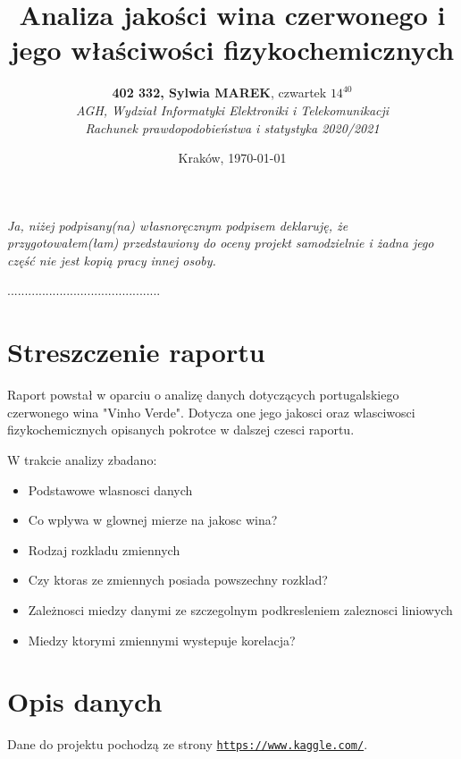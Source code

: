 \documentclass{article}
\title{Analiza jakości wina czerwonego i jego właściwości fizykochemicznych}
\author{\textbf{402 332, Sylwia MAREK}, czwartek $14^{40}$\\ 
\textit{AGH, Wydział Informatyki Elektroniki i Telekomunikacji}\\
\textit{Rachunek prawdopodobieństwa i statystyka 2020/2021}}
\date{Kraków, \today}
\begin{document}






\maketitle

\textit{Ja, niżej podpisany(na) własnoręcznym podpisem deklaruję, że przygotowałem(łam) przedstawiony do oceny projekt samodzielnie i żadna jego część nie jest kopią pracy innej osoby.}
\begin{flushright}
{............................................}
\end{flushright}

\section{Streszczenie raportu}
Raport powstał w oparciu o analizę danych dotyczących portugalskiego czerwonego wina "Vinho Verde".
Dotycza one jego jakosci oraz wlasciwosci fizykochemicznych opisanych pokrotce w dalszej czesci raportu.

W trakcie analizy zbadano:
\begin{itemize}
\item Podstawowe wlasnosci danych
\item Co wplywa w glownej mierze na jakosc wina?
\item Rodzaj rozkladu zmiennych 
\item Czy ktoras ze zmiennych posiada powszechny rozklad?
\item Zależnosci miedzy danymi ze szczegolnym podkresleniem zaleznosci  liniowych
\item Miedzy ktorymi zmiennymi wystepuje korelacja?
\end{itemize}

\section{Opis danych}

Dane do projektu pochodzą ze strony \href{url}{\texttt{https://www.kaggle.com/}}. 
\end{document}
